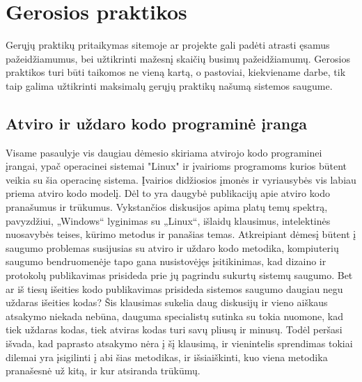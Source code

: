 \documentclass[a4paper,12pt,fleqn]{article}
\begin{document}
\newpage
\section{Gerosios praktikos}
\label{sec:goodpractices}

Gerųjų praktikų pritaikymas sitemoje ar projekte gali padėti atrasti ęsamus pažeidžiamumus, bei užtikrinti mažesnį skaičių busimų pažeidžiamumų. Gerosios praktikos turi būti taikomos ne vieną kartą, o pastoviai, kiekviename darbe, tik taip galima užtikrinti maksimalų gerųjų praktikų našumą sistemos saugume.

\subsection{Atviro ir uždaro kodo programinė įranga}
\label{sec:example}

Visame pasaulyje vis daugiau dėmesio skiriama atvirojo kodo programinei įrangai, ypač operacinei sistemai "Linux" ir įvairioms programoms kurios būtent veikia su šia operacinę sistema. Įvairios didžiosios įmonės ir vyriausybės vis labiau priema atviro kodo modelį. Dėl to yra daugybė publikacijų apie atviro kodo pranašumus ir trūkumus. Vykstančios diskusijos apima platų temų spektrą, pavyzdžiui, „Windows“ lyginimas su „Linux“, išlaidų klausimus, intelektinės nuosavybės teises, kūrimo metodus ir panašias temas. Atkreipiant dėmesį būtent į saugumo problemas susijusias su atviro ir uždaro kodo metodika, kompiuterių saugumo bendruomenėje tapo gana nusistovėjęs įsitikinimas, kad dizaino ir protokolų publikavimas prisideda prie jų pagrindu sukurtų sistemų saugumo\cite{hoepman2008increased}. Bet ar iš tiesų išeities kodo publikavimas prisideda sistemos saugumo daugiau negu uždaras išeities kodas? Šis klausimas sukelia daug diskusijų ir vieno aiškaus atsakymo niekada nebūna, dauguma specialistų sutinka su tokia nuomone, kad tiek uždaras kodas, tiek atviras kodas turi savų pliusų ir minusų. Todėl peršasi išvada, kad paprasto atsakymo nėra į šį klausimą, ir vienintelis sprendimas tokiai dilemai yra įsigilinti į abi šias metodikas, ir išsiaiškinti, kuo viena metodika pranašesnė už kitą, ir kur atsiranda trūkūmų.
\end{document}
